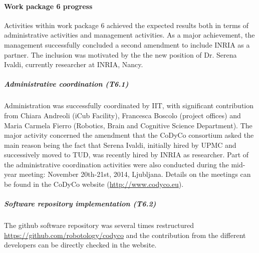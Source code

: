 

\paragraph{Work package 6 progress}

Activities within work package 6 achieved the expected results both in terms of administrative activities and management activities. As a major achievement, the management successfully concluded a second amendment to include INRIA as a partner. The inclusion was motivated by the the new position of Dr. Serena Ivaldi, currently researcher at INRIA, Nancy. 

\subparagraph{Administrative coordination (T6.1)}
Administration was successfully coordinated by IIT, with significant contribution from Chiara Andreoli (iCub Facility), Francesca Boscolo (project offices) and Maria Carmela Fierro (Robotics, Brain and Cognitive Science Department). The major activity concerned the amendment that the CoDyCo consortium asked the main reason being the fact that Serena Ivaldi, initially hired by UPMC and successively moved to TUD, was recently hired by INRIA as researcher. Part of the administrative coordination activities were also conducted during the mid-year meeting: November 20th-21st, 2014, Ljubljana.  Details on the meetings can be found in the CoDyCo website (\url{http://www.codyco.eu}).

\subparagraph{Software repository implementation (T6.2)}

The github software repository was several times restructured \url{https://github.com/robotology/codyco} and the contribution from the different developers can be directly checked in the website. 
